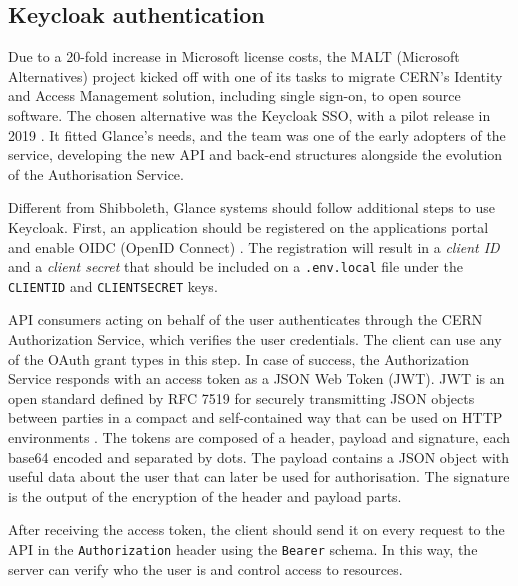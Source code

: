 \subsection{Keycloak authentication}

Due to a 20-fold increase in Microsoft license costs, the MALT (Microsoft Alternatives) \cite{malt} \cite{malt-internal} \cite{malt-auth} project kicked off with one of its tasks to migrate CERN's Identity and Access Management solution, including single sign-on, to open source software. The chosen alternative was the Keycloak SSO, with a pilot release in 2019 \cite{keycloak-article}. It fitted Glance's needs, and the team was one of the early adopters of the service, developing the new API and back-end structures alongside the evolution of the Authorisation Service.

Different from Shibboleth, Glance systems should follow additional steps to use Keycloak. First, an application should be registered on the applications portal and enable OIDC (OpenID Connect) \cite{registering-application} \cite{cern-auth-oidc-guide}. The registration will result in a \textit{client ID} and a \textit{client secret} that should be included on a \texttt{.env.local} file under the \texttt{CLIENT\textunderscore ID} and \texttt{CLIENT\textunderscore SECRET} keys.

API consumers acting on behalf of the user authenticates through the CERN Authorization Service, which verifies the user credentials. The client can use any of the OAuth grant types \cite{oauth-grant-type} in this step.  In case of success, the Authorization Service responds with an access token as a JSON Web Token (JWT). JWT is an open standard defined by RFC 7519 \cite{rfc-7519} for securely transmitting JSON objects between parties in a compact and self-contained way that can be used on HTTP environments \cite{jwt-introduction}. The tokens are composed of a header, payload and signature, each base64 encoded and separated by dots. The payload contains a JSON object with useful data about the user that can later be used for authorisation. The signature is the output of the encryption of the header and payload parts.


After receiving the access token, the client should send it on every request to the API in the \texttt{Authorization} header using the \texttt{Bearer} schema. In this way, the server can verify who the user is and control access to resources.

